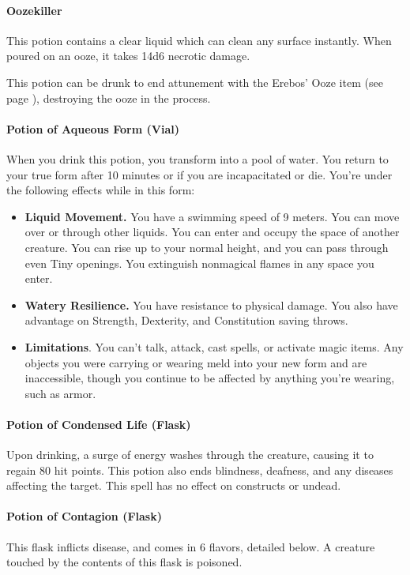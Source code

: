 \paragraph{Oozekiller} \label{item::oozekiller}
    This potion contains a clear liquid which can clean any surface instantly.
    When poured on an ooze, it takes 14d6 necrotic damage.

    This potion can be drunk to end attunement with the Erebos' Ooze item (see page \pageref{item::erebosooze}), destroying the ooze in the process.
\paragraph{Potion of Aqueous Form (Vial)}
    When you drink this potion, you transform into a pool of water.
    You return to your true form after 10 minutes or if you are incapacitated or die.
    You're under the following effects while in this form:
    \begin{itemize}
        \item \textbf{Liquid Movement.} You have a swimming speed of 9 meters.
        You can move over or through other liquids.
        You can enter and occupy the space of another creature.
        You can rise up to your normal height, and you can pass through even Tiny openings.
        You extinguish nonmagical flames in any space you enter.
        \item \textbf{Watery Resilience.} You have resistance to physical damage.
        You also have advantage on Strength, Dexterity, and Constitution saving throws.
        \item \textbf{Limitations}. You can't talk, attack, cast spells, or activate magic items.
        Any objects you were carrying or wearing meld into your new form and are inaccessible, though you continue to be affected by anything you're wearing, such as armor.
    \end{itemize}
\paragraph{Potion of Condensed Life (Flask)} %
    Upon drinking, a surge of energy washes through the creature, causing it to regain 80 hit points.
    This potion also ends blindness, deafness, and any diseases affecting the target.
    This spell has no effect on constructs or undead.
\paragraph{Potion of Contagion (Flask)} %
    This flask inflicts disease, and comes in 6 flavors, detailed below.
    A creature touched by the contents of this flask is poisoned.

